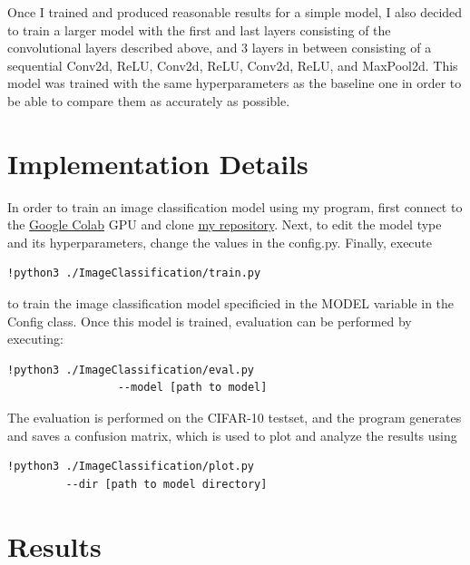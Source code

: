 \documentclass[11pt,a4paper]{article}
\begin{document}
Once I trained and produced reasonable results for a simple model, I also decided to train a larger model with the first and last 
layers consisting of the convolutional layers described above, and 3 layers in between consisting of a sequential Conv2d, ReLU, Conv2d,
 ReLU, Conv2d, ReLU, and MaxPool2d. This model was trained with the same hyperparameters as the baseline one in order to be able to compare 
 them as accurately as possible.

 
\section{Implementation Details}

In order to train an image classification model using my program, first connect to the \href{https://colab.research.google.com/}{Google Colab} GPU 
and clone \href{https://github.com/alexrasla/ImageClassification.git}{my repository}.
Next, to edit the model type and its hyperparameters, change the values in the config.py. Finally, execute 
\begin{Verbatim}[fontsize=\small]
  !python3 ./ImageClassification/train.py
\end{Verbatim}
 to train the image classification model specificied in the MODEL variable in the Config class.
Once this model is trained, evaluation can be performed by executing: 
 \begin{Verbatim}[fontsize=\small]
  !python3 ./ImageClassification/eval.py 
                 --model [path to model]
 \end{Verbatim}
The evaluation is performed on the CIFAR-10 testset, and the program generates and saves a 
confusion matrix, which is used to plot and analyze the results using 
\begin{Verbatim}[fontsize=\small]
  !python3 ./ImageClassification/plot.py 
         --dir [path to model directory]
\end{Verbatim}

\section{Results}
\end{document}
